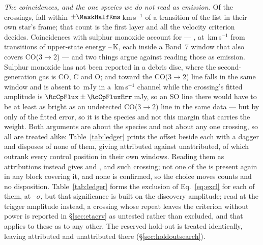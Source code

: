 \emph{The coincidences, and the one species we do not read as emission.} Of
the \NCross{} crossings, \MkNCoinc{} fall within
$\pm\MaskHalfKms$\,km\,s$^{-1}$ of a transition of the list in their own
star's frame; that count is the first layer and all the velocity criterion
decides. Coincidences with sulphur monoxide account for \MkNSODecide{} ---
\MkSOStars, at \MkSODvList\,km\,s$^{-1}$ from transitions of upper-state
energy \MkSOEuLo--\MkSOEuHi\,K, each inside a Band~7 window that also covers
CO($3\to2$) --- and two things argue against reading those as emission.
Sulphur monoxide has not been reported in a debris disc, where the
second-generation gas is CO, C and O; and toward \FrCpStar{} the CO($3\to2$)
line falls in the same window and is absent to \FrCpCoLimMJy\,mJy in a
\FrCpCoChanKms\,km\,s$^{-1}$ channel while the crossing's fitted amplitude is
$\RcCpFlux\pm\RcCpFluxErr$\,mJy, so an SO line there would have to be at
least as bright as an undetected CO($3\to2$) line in the same data --- but
by only \RqAmpSigmaCp{} of the fitted error, so it is the species and not
this margin that carries the weight. Both arguments are about the species and
not about any one crossing, so all \MkNSODecide{} are treated alike:
Table~\ref{tab:ledger} prints the offset beside each with a dagger and
disposes of none of them, giving \MkAttr{} attributed against \MkUnattr{}
unattributed, of which \MkRankLeadWord{} outrank every control position in
their own windows.
Reading them as attributions instead gives \MkAttrAlt{} and \MkUnattrAlt,
and \MkRankLeadAlt{} such crossing; not one of the \MkNSODecide{} is present
again in any block covering it, and none is confirmed, so the choice moves
counts and no disposition. Table~\ref{tab:ledger} forms the exclusion of
Eq.~\ref{eq:excl} for each of them, at
\MkAttrExclLo--\MkAttrExclHi$\sigma$, but that significance is built on the
discovery amplitude; read at the trigger amplitude instead, a crossing whose
repeat leaves the criterion without power is reported in
\S\ref{sec:etacrv} as untested rather than excluded, and that applies to
these as to any other. The reserved hold-out is treated identically, leaving \HoNAttr{}
attributed and \HoNUnattr{} unattributed there (\S\ref{sec:holdoutsearch}).

